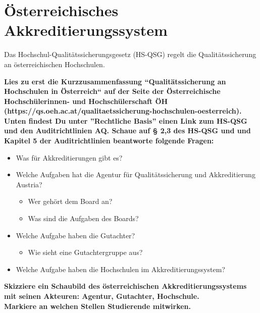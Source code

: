 \documentclass{scrartcl}
\begin{document}
\pagestyle{scrheadings}
\clearscrheadfoot
{}
\section*{Österreichisches Akkreditierungssystem}

Das Hochschul-Qualitätssicherungsgesetz (HS-QSG) regelt die Qualitätssicherung an österreichischen Hochschulen.

\vspace{1cm}

\textbf{Lies zu erst die Kurzzusammenfassung ``Qualitätssicherung an Hochschulen in Österreich`` auf der Seite der Österreichische Hochschülerinnen- und Hochschülerschaft ÖH (https://qs.oeh.ac.at/qualitaetssicherung-hochschulen-oesterreich).\\
Unten findest Du  unter ''Rechtliche  Basis'' einen Link zum HS-QSG und den Auditrichtlinien AQ. Schaue auf § 2,3 des HS-QSG und und Kapitel 5 der Auditrichtlinien beantworte folgende Fragen:}

\begin{itemize}
\item Was für Akkreditierungen gibt es?
\item Welche Aufgaben hat die Agentur für Qualitätssicherung und Akkreditierung Austria?
	\begin{itemize}
		\item Wer gehört dem Board an?
		\item Was sind die Aufgaben des Boards?
	\end{itemize}
\item Welche Aufgabe haben die Gutachter? 
	\begin{itemize}
		\item Wie sieht eine Gutachtergruppe aus?
	\end{itemize}
\item Welche Aufgabe haben die Hochschulen im Akkreditierungssystem?
\end{itemize}


\vspace{1cm}

\textbf{Skizziere ein Schaubild des österreichischen Akkreditierungssystems mit seinen Akteuren: Agentur, Gutachter, Hochschule. \\
Markiere an welchen Stellen Studierende mitwirken.}
\end{document}
